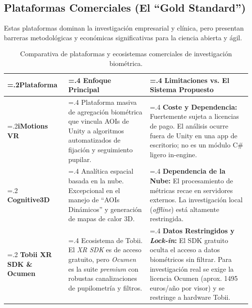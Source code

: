 \documentclass[12pt,a4paper]{article}
\begin{document}
\subsection{Plataformas Comerciales (El ``Gold Standard'')}
Estas plataformas dominan la investigación empresarial y clínica, pero presentan barreras metodológicas y económicas significativas para la ciencia abierta y ágil.

\begin{table}[H]
    \centering
    \small
    \begin{tabularx}{\textwidth}{@{} >{\hsize=.2\hsize}X >{\hsize=.4\hsize}X >{\hsize=.4\hsize}X @{}}
        \toprule
        \textbf{Plataforma}                                 & \textbf{Enfoque Principal}                                                                                                                                              & \textbf{Limitaciones vs. El Sistema Propuesto}                                                                                                                                                                                           \\
        \midrule
        \textbf{iMotions VR} \cite{imotions}                & Plataforma masiva de agregación biométrica que vincula AOIs de Unity a algoritmos automatizados de fijación y seguimiento pupilar.                                      & \textbf{Coste y Dependencia:} Fuertemente sujeta a licencias de pago. El análisis ocurre fuera de Unity en una app de escritorio; no es un módulo C\# ligero in-engine.                                                                  \\
        \addlinespace
        \textbf{Cognitive3D} \cite{cognitive3d}             & Analítica espacial basada en la nube. Excepcional en el manejo de ``AOIs Dinámicos'' y generación de mapas de calor 3D.                                                 & \textbf{Dependencia de la Nube:} El procesamiento de métricas recae en servidores externos. La investigación local (\textit{offline}) está altamente restringida.                                                                        \\
        \addlinespace
        \textbf{Tobii XR SDK \& Ocumen} \cite{tobii_ocumen} & Ecosistema de Tobii. El \textit{XR SDK} es de acceso gratuito, pero \textit{Ocumen} es la suite \textit{premium} con robustas canalizaciones de pupilometría y filtros. & \textbf{Datos Restringidos y \textit{Lock-in}:} El SDK gratuito oculta el acceso a datos biométricos sin filtrar. Para investigación real se exige la licencia Ocumen (aprox. 1495 euros/año por visor) y se restringe a hardware Tobii. \\
        \bottomrule
    \end{tabularx}
    \caption{Comparativa de plataformas y ecosistemas comerciales de investigación biométrica.}
\end{table}
\end{document}
